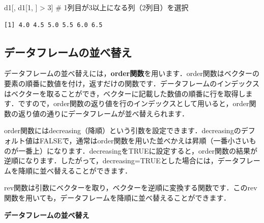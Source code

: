 \documentclass[
  letterpaper,
  DIV=11,
  numbers=noendperiod]{scrreprt}
\newenvironment{Shaded}{\begin{snugshade}}{\end{snugshade}}
\newcommand{\AttributeTok}[1]{\textcolor[rgb]{0.40,0.45,0.13}{#1}}
\newcommand{\CommentTok}[1]{\textcolor[rgb]{0.37,0.37,0.37}{#1}}
\newcommand{\DecValTok}[1]{\textcolor[rgb]{0.68,0.00,0.00}{#1}}
\newcommand{\FunctionTok}[1]{\textcolor[rgb]{0.28,0.35,0.67}{#1}}
\newcommand{\NormalTok}[1]{\textcolor[rgb]{0.00,0.23,0.31}{#1}}
\newcommand{\OtherTok}[1]{\textcolor[rgb]{0.00,0.23,0.31}{#1}}
\newcommand{\SpecialCharTok}[1]{\textcolor[rgb]{0.37,0.37,0.37}{#1}}
\newcommand{\StringTok}[1]{\textcolor[rgb]{0.13,0.47,0.30}{#1}}
\begin{document}
\begin{Shaded}
\begin{Highlighting}[]
\NormalTok{d1[, d1[}\DecValTok{1}\NormalTok{, ] }\SpecialCharTok{\textgreater{}} \DecValTok{3}\NormalTok{] }\CommentTok{\# 1列目が3以上になる列（2列目）を選択}
\end{Highlighting}
\end{Shaded}

\begin{verbatim}
[1] 4.0 4.5 5.0 5.5 6.0 6.5
\end{verbatim}

\hypertarget{ux30c7ux30fcux30bfux30d5ux30ecux30fcux30e0ux306eux4e26ux3079ux66ffux3048}{%
\subsection{データフレームの並べ替え}\label{ux30c7ux30fcux30bfux30d5ux30ecux30fcux30e0ux306eux4e26ux3079ux66ffux3048}}

データフレームの並べ替えには，\textbf{order関数}を用います．order関数はベクターの要素の順番に数値を付け，返すだけの関数です．データフレームのインデックスはベクターを取ることができ，ベクターに記載した数値の順番に行を取得します．ですので，order関数の返り値を行のインデックスとして用いると，order関数の返り値の通りにデータフレームが並べ替えられます．

order関数にはdecreasing（降順）という引数を設定できます．decreasingのデフォルト値はFALSEで，通常はorder関数を用いた並べかえは昇順（一番小さいものが一番上）になります．decreasingをTRUEに設定すると，order関数の結果が逆順になります．したがって，decreasing=TRUEとした場合には，データフレームを降順に並べ替えることができます．

rev関数は引数にベクターを取り，ベクターを逆順に変換する関数です．このrev関数を用いても，データフレームを降順に並べ替えることができます．

\textbf{データフレームの並べ替え}

\begin{Shaded}
\end{Shaded}
\end{document}
